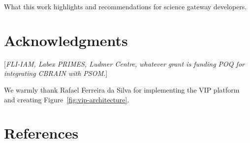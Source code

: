 \documentclass[preprint,3p,twocolumn]{elsarticle}
\newcommand{\todo}[1]{\color{blue}\xspace[\emph{#1}]\xspace\color{black}}
\begin{document}
What this work highlights and recommendations for science gateway
developers.

\section{Acknowledgments}

\todo{FLI-IAM, Labex PRIMES, Ludmer Centre, whatever grant is funding
  POQ for integrating CBRAIN with PSOM.}

We warmly thank Rafael Ferreira da Silva for implementing the VIP
platform and creating Figure~\ref{fig:vip-architecture}.

\section*{References}

 

\end{document}
